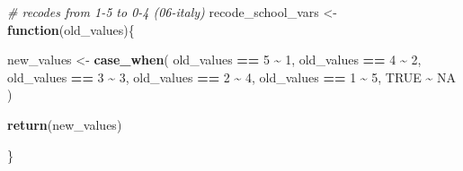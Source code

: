 \documentclass[
]{article}
\newenvironment{Shaded}{\begin{snugshade}}{\end{snugshade}}
\newcommand{\CommentTok}[1]{\textcolor[rgb]{0.56,0.35,0.01}{\textit{#1}}}
\newcommand{\ConstantTok}[1]{\textcolor[rgb]{0.56,0.35,0.01}{#1}}
\newcommand{\ControlFlowTok}[1]{\textcolor[rgb]{0.13,0.29,0.53}{\textbf{#1}}}
\newcommand{\DecValTok}[1]{\textcolor[rgb]{0.00,0.00,0.81}{#1}}
\newcommand{\FunctionTok}[1]{\textcolor[rgb]{0.13,0.29,0.53}{\textbf{#1}}}
\newcommand{\NormalTok}[1]{#1}
\newcommand{\OtherTok}[1]{\textcolor[rgb]{0.56,0.35,0.01}{#1}}
\newcommand{\SpecialCharTok}[1]{\textcolor[rgb]{0.81,0.36,0.00}{\textbf{#1}}}
\begin{document}
\begin{Shaded}
\begin{Highlighting}[]
\CommentTok{\# recodes from 1{-}5 to 0{-}4 (06{-}italy)}
\NormalTok{recode\_school\_vars }\OtherTok{\textless{}{-}} \ControlFlowTok{function}\NormalTok{(old\_values)\{}
  
\NormalTok{  new\_values }\OtherTok{\textless{}{-}} \FunctionTok{case\_when}\NormalTok{(}
\NormalTok{    old\_values }\SpecialCharTok{==} \DecValTok{5} \SpecialCharTok{\textasciitilde{}} \DecValTok{1}\NormalTok{,}
\NormalTok{    old\_values }\SpecialCharTok{==} \DecValTok{4} \SpecialCharTok{\textasciitilde{}} \DecValTok{2}\NormalTok{,}
\NormalTok{    old\_values }\SpecialCharTok{==} \DecValTok{3} \SpecialCharTok{\textasciitilde{}} \DecValTok{3}\NormalTok{,}
\NormalTok{    old\_values }\SpecialCharTok{==} \DecValTok{2} \SpecialCharTok{\textasciitilde{}} \DecValTok{4}\NormalTok{,}
\NormalTok{    old\_values }\SpecialCharTok{==} \DecValTok{1} \SpecialCharTok{\textasciitilde{}} \DecValTok{5}\NormalTok{,}
    \ConstantTok{TRUE} \SpecialCharTok{\textasciitilde{}} \ConstantTok{NA}
\NormalTok{  )}
  
  \FunctionTok{return}\NormalTok{(new\_values)}
  
\NormalTok{\}}


\end{Highlighting}
\end{Shaded}
\end{document}
